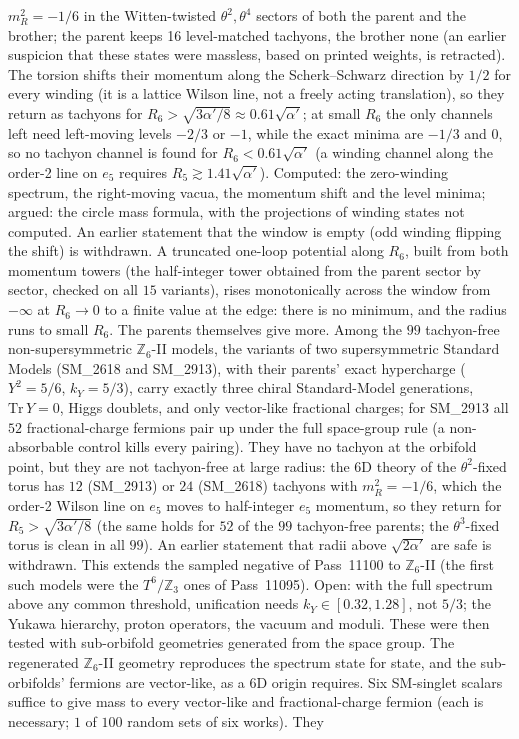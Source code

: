 \begin{boundary}
$m_R^2=-1/6$ in the Witten-twisted $\theta^2,\theta^4$ sectors of both the parent and the brother; the parent keeps 16 level-matched tachyons, the brother none (an earlier suspicion that these states were massless, based on printed weights, is retracted). The torsion shifts their momentum along the Scherk--Schwarz direction by $1/2$ for every winding (it is a lattice Wilson line, not a freely acting translation), so they return as tachyons for $R_6>\sqrt{3\alpha'/8}\approx0.61\sqrt{\alpha'}$; at small $R_6$ the only channels left need left-moving levels $-2/3$ or $-1$, while the exact minima are $-1/3$ and $0$, so no tachyon channel is found for $R_6<0.61\sqrt{\alpha'}$ (a winding channel along the order-2 line on $e_5$ requires $R_5\gtrsim1.41\sqrt{\alpha'}$). Computed: the zero-winding spectrum, the right-moving vacua, the momentum shift and the level minima; argued: the circle mass formula, with the projections of winding states not computed. An earlier statement that the window is empty (odd winding flipping the shift) is withdrawn.  A truncated one-loop potential along $R_6$, built from both momentum towers (the half-integer tower obtained from the parent sector by sector, checked on all $15$ variants), rises monotonically across the window from $-\infty$ at $R_6\to0$ to a finite value at the edge: there is no minimum, and the radius runs to small $R_6$.  The parents themselves give more. Among the $99$ tachyon-free non-supersymmetric $\mathbb Z_6$-II models, the variants of two supersymmetric Standard Models (SM\_2618 and SM\_2913), with their parents' exact hypercharge ($Y^2=5/6$, $k_Y=5/3$), carry exactly three chiral Standard-Model generations, $\mathrm{Tr}\,Y=0$, Higgs doublets, and only vector-like fractional charges; for SM\_2913 all $52$ fractional-charge fermions pair up under the full space-group rule (a non-absorbable control kills every pairing). They have no tachyon at the orbifold point, but they are not tachyon-free at large radius: the 6D theory of the $\theta^2$-fixed torus has $12$ (SM\_2913) or $24$ (SM\_2618) tachyons with $m_R^2=-1/6$, which the order-2 Wilson line on $e_5$ moves to half-integer $e_5$ momentum, so they return for $R_5>\sqrt{3\alpha'/8}$ (the same holds for $52$ of the $99$ tachyon-free parents; the $\theta^3$-fixed torus is clean in all $99$). An earlier statement that radii above $\sqrt{2\alpha'}$ are safe is withdrawn. This extends the sampled negative of Pass~11100 to $\mathbb Z_6$-II (the first such models were the $T^6/\mathbb Z_3$ ones of Pass~11095). Open: with the full spectrum above any common threshold, unification needs $k_Y\in[0.32,1.28]$, not $5/3$; the Yukawa hierarchy, proton operators, the vacuum and moduli.  These were then tested with sub-orbifold geometries generated from the space group. The regenerated $\mathbb Z_6$-II geometry reproduces the spectrum state for state, and the sub-orbifolds' fermions are vector-like, as a 6D origin requires. Six SM-singlet scalars suffice to give mass to every vector-like and fractional-charge fermion (each is necessary; $1$ of $100$ random sets of six works). They 
\end{boundary}
